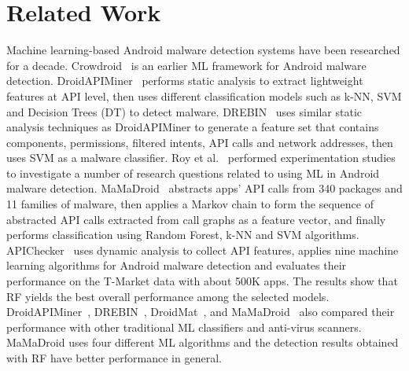\section{Related Work}
\label{sec:related}

Machine learning-based Android malware detection systems have been
researched for a decade.  Crowdroid~\cite{Iker:SPSM11} is an earlier
ML framework for Android malware detection.
DroidAPIMiner~\cite{Aafer:SecureComm13} performs static
analysis to extract lightweight features at API level, then uses
different classification models such as k-NN, SVM and Decision Trees
(DT) to detect malware. DREBIN~\cite{Arp:NDSS14} uses similar static analysis techniques
as DroidAPIMiner to generate a feature set that contains components,
permissions, filtered intents, API calls and network addresses, then
uses SVM as a malware classifier. 
Roy et al.~\cite{Roy:ACSAC15} performed experimentation studies to investigate
a number of research questions related to using ML in Android malware
detection.
MaMaDroid~\cite{Mariconti:NDSS2017} abstracts apps' API calls from 340
packages and 11 families of malware, then
applies a Markov chain to form the sequence of abstracted API calls extracted
from call graphs as a feature vector, and finally performs  classification
using Random Forest, k-NN and SVM algorithms. APIChecker~\cite{Gong:EuroSys20}
uses dynamic analysis to collect API features, applies nine machine learning algorithms for Android malware detection and evaluates their performance on the T-Market data with about 500K apps. The results show that RF yields the best overall performance among the selected models.
DroidAPIMiner~\cite{Gascon:AISec13},
DREBIN~\cite{Arp:NDSS14}, DroidMat~\cite{Wu:AsiaJCIS12}, and
MaMaDroid~\cite{Mariconti:NDSS2017} also compared their performance with
other traditional ML classifiers and anti-virus scanners. MaMaDroid uses four different ML algorithms and the detection results obtained with RF have better performance in general.

